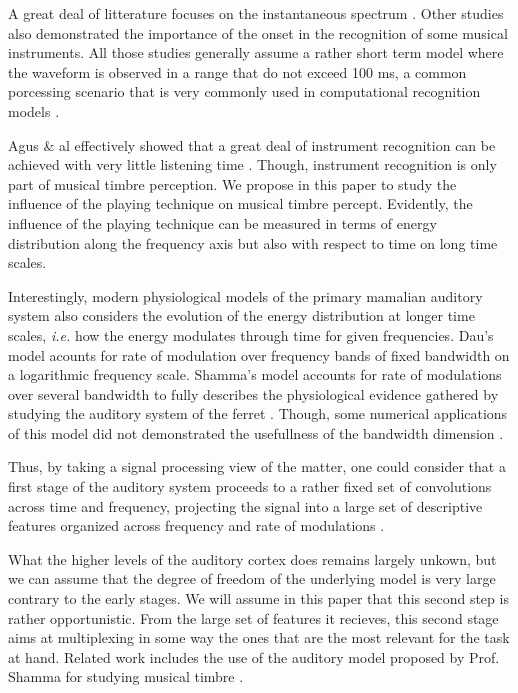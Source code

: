 \documentclass{article}
\begin{document}
A great deal of litterature focuses on the instantaneous spectrum \cite{grey1978perceptual}. Other studies also demonstrated the importance of the onset in the recognition of some musical instruments. All those studies generally assume a rather short term model where the waveform is observed in a range that do not exceed 100 ms, a common porcessing scenario that is very commonly used in computational recognition models \cite{tzanetakis2002musical}.

Agus \& al effectively showed that a great deal of instrument recognition can be achieved with very little listening time \cite{agus2012fast}. Though, instrument recognition is only part of musical timbre perception. We propose in this paper to study the influence of the playing technique on musical timbre percept. Evidently, the influence of the playing technique can be measured in terms of energy distribution along the frequency axis but also with respect to time on long time scales.

Interestingly, modern physiological models of the primary mamalian auditory system also considers the evolution of the energy distribution at longer time scales, \textit{i.e.} how the energy modulates through time for given frequencies.  Dau's model acounts for  rate of modulation over frequency bands of fixed bandwidth on a logarithmic frequency scale\cite{dau1997modeling}. Shamma's model accounts for rate  of modulations over several bandwidth to fully describes the physiological evidence gathered by studying the auditory system of the ferret \cite{yang1992auditory}. Though, some numerical applications of this model did not demonstrated the usefullness of the bandwidth dimension \cite{mesgarani2006discrimination}.

Thus, by taking a signal processing view of the matter, one could consider that a first stage of the auditory system proceeds to a rather fixed set of convolutions across time and frequency, projecting the signal into a large set of descriptive features organized across frequency and rate of modulations \cite{anden2014deep}.

What the higher levels of the auditory cortex does remains largely unkown, but we can assume that the degree of freedom of the underlying model is very large contrary to the early stages.  We will assume in this paper that this second step is rather opportunistic. From the large set of features it recieves, this second stage aims at multiplexing in some way the ones that are the most relevant for the task at hand. Related work includes the use of the auditory model proposed by Prof. Shamma for studying musical timbre \cite{patil2012music}.
\end{document}
